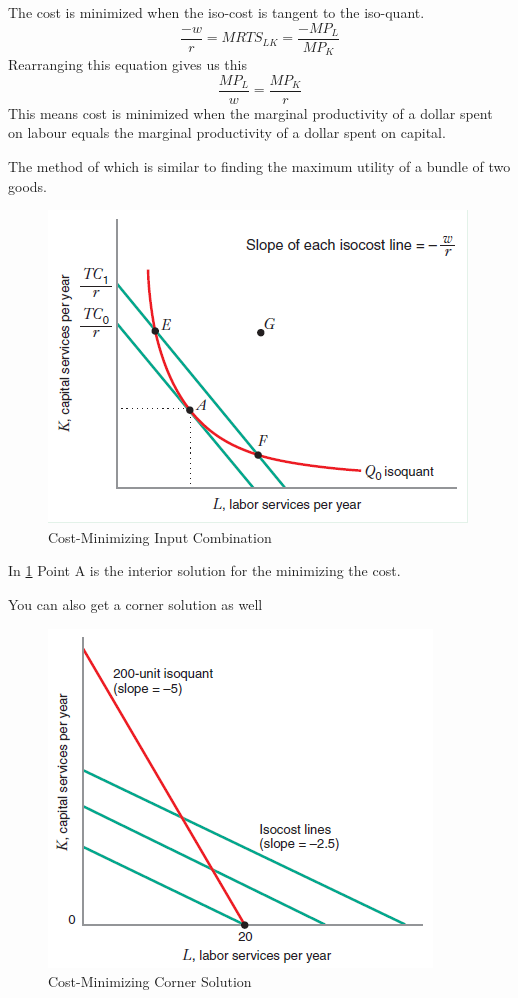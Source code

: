 \documentclass[../ECON-281-Notes.tex]{subfiles}
\begin{document}
The cost is minimized when the iso-cost is tangent to the iso-quant. 
\[
    \frac{-w}{r} = MRTS_{LK} = \frac{-MP_L}{MP_K}
\]
Rearranging this equation gives us this
\[
    \frac{MP_L}{w} = \frac{MP_K}{r}
\]
This means cost is minimized when the marginal productivity of a dollar spent on labour equals the marginal productivity of a dollar spent on capital. 

The method of which is similar to finding the maximum utility of a bundle of two goods. 

\begin{figure}[h]
    \centering
    \includegraphics[width=\columnwidth]{../assets/cost-minimizing-input.png}
    \caption{Cost-Minimizing Input Combination}
    \label{fig:cost_min_input}
\end{figure}
In \cref{fig:cost_min_input} Point A is the interior solution for the minimizing the cost.

You can also get a corner solution as well 
\begin{figure}[h]
    \centering
    \includegraphics[width=0.9\columnwidth]{../assets/corner-soln-isocost.png}
    \caption{Cost-Minimizing Corner Solution}
    \label{fig:cost_min_corner}
\end{figure}
\end{document}
